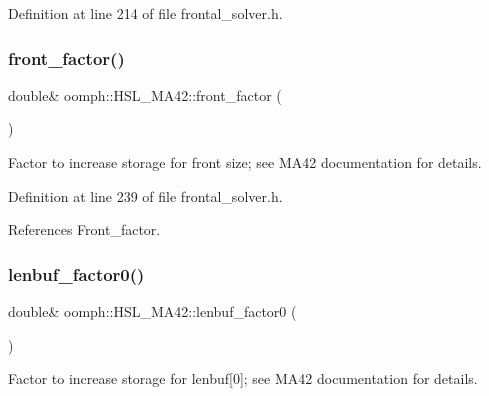Definition at line 214 of file frontal\+\_\+solver.\+h.

\mbox{\label{classoomph_1_1HSL__MA42_a15a7272fbf8ae4e75f781f90a768ee12}} 
\subsubsection{\texorpdfstring{front\+\_\+factor()}{front\_factor()}}
{\footnotesize\ttfamily double\& oomph\+::\+H\+S\+L\+\_\+\+M\+A42\+::front\+\_\+factor (\begin{DoxyParamCaption}{ }\end{DoxyParamCaption})\hspace{0.3cm}{\ttfamily [inline]}}



Factor to increase storage for front size; see M\+A42 documentation for details. 



Definition at line 239 of file frontal\+\_\+solver.\+h.



References Front\+\_\+factor.

\mbox{\label{classoomph_1_1HSL__MA42_add0eb83857efab7558a8d3b11c6d3ade}} 
\subsubsection{\texorpdfstring{lenbuf\+\_\+factor0()}{lenbuf\_factor0()}}
{\footnotesize\ttfamily double\& oomph\+::\+H\+S\+L\+\_\+\+M\+A42\+::lenbuf\+\_\+factor0 (\begin{DoxyParamCaption}{ }\end{DoxyParamCaption})\hspace{0.3cm}{\ttfamily [inline]}}



Factor to increase storage for lenbuf\mbox{[}0\mbox{]}; see M\+A42 documentation for details. 



